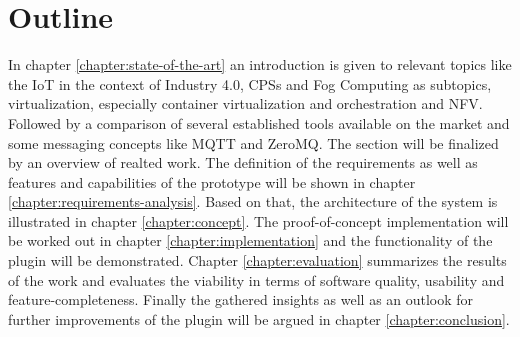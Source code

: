 \section{Outline}
In chapter \ref{chapter:state-of-the-art} an introduction is given to relevant topics like the \ac{IoT} in the context of Industry 4.0, \acp{CPS} and Fog Computing as subtopics, virtualization, especially container virtualization and orchestration and \ac{NFV}.
Followed by a comparison of several established tools available on the market and some messaging concepts like \ac{MQTT} and ZeroMQ.
The section will be finalized by an overview of realted work.
The definition of the requirements as well as features and capabilities of the prototype will be shown in chapter \ref{chapter:requirements-analysis}.
Based on that, the architecture of the system is illustrated in chapter \ref{chapter:concept}.
The proof-of-concept implementation will be worked out in chapter \ref{chapter:implementation} and the functionality of the plugin will be demonstrated.
Chapter \ref{chapter:evaluation} summarizes the results of the work and evaluates the viability in terms of software quality, usability and feature-completeness.
Finally the gathered insights as well as an outlook for further improvements of the plugin will be argued in chapter \ref{chapter:conclusion}.


